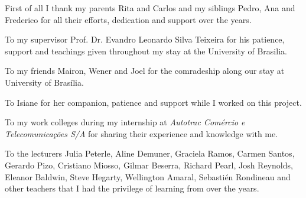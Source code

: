 \begin{agradecimentos}
First of all I thank my parents Rita and Carlos and my siblings Pedro, Ana and Frederico for all their efforts, dedication and support over the years.
\par
To my supervisor Prof. Dr. Evandro Leonardo Silva Teixeira for his patience, support and teachings given throughout my stay at the University of Brasilia.
\par
To my friends Mairon, Wener and Joel for the comradeship along our stay at University of Brasília.
\par
To Isiane for her companion, patience and support while I worked on this project.
\par
To my work colleges during my internship at \textit{Autotrac Comércio e Telecomunicações S/A} for sharing their experience and knowledge with me.
\par
To the lecturers Julia Peterle, Aline Demuner, Graciela Ramos, Carmen Santos, Gerardo Pizo, Cristiano Miosso, Gilmar Beserra, Richard Pearl, Josh Reynolds, Eleanor Baldwin, Steve Hegarty, Wellington Amaral, Sebastién Rondineau and other teachers that I had the privilege of learning from over the years.
\end{agradecimentos}
